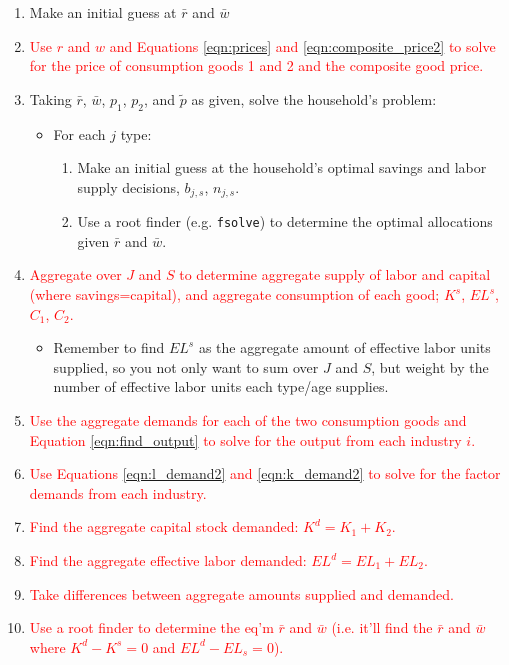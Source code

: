 \documentclass[letterpaper,12pt]{article}
\theoremstyle{definition}
\begin{document}
\begin{spacing}{1.5}
\begin{enumerate}
\item Make an initial guess at $\bar{r}$ and $\bar{w}$
\item \textcolor{red}{Use $r$ and $w$ and Equations \ref{eqn:prices} and \ref{eqn:composite_price2} to solve for the price of consumption goods 1 and 2 and the composite good price.}
\item Taking $\bar{r}$, $\bar{w}$, $p_{1}$, $p_{2}$, and $\tilde{p}$ as given, solve the household's problem:
	\begin{itemize}
	\item For each $j$ type:
		\begin{enumerate}
		\item Make an initial guess at the household's optimal savings and labor supply decisions, $b_{j,s}$, $n_{j,s}$.
		\item Use a root finder (e.g. \texttt{fsolve}) to determine the optimal allocations given $\bar{r}$ and $\bar{w}$.
		\end{enumerate}
	\end{itemize}
\item \textcolor{red}{Aggregate over $J$ and $S$ to determine aggregate supply of labor and capital (where savings=capital), and aggregate consumption of each good; $K^{s}$, ${EL}^{s}$, $C_{1}$, $C_{2}$.}
	\begin{itemize}
	\item Remember to find ${EL}^{s}$ as the aggregate amount of effective labor units supplied, so you not only want to sum over $J$ and $S$, but weight by the number of effective labor units each type/age supplies.
	\end{itemize}
\item \textcolor{red}{Use the aggregate demands for each of the two consumption goods and Equation \ref{eqn:find_output} to solve for the output from each industry $i$.}
\item \textcolor{red}{Use Equations \ref{eqn:l_demand2} and \ref{eqn:k_demand2} to solve for the factor demands from each industry.}
\item \textcolor{red}{Find the aggregate capital stock demanded: $K^{d} = K_{1}+K_{2}$.}
\item \textcolor{red}{Find the aggregate effective labor demanded: $EL^{d} = EL_{1}+EL_{2}$.}
\item \textcolor{red}{Take differences between aggregate amounts supplied and demanded.}
\item \textcolor{red}{Use a root finder to determine the eq'm $\bar{r}$ and $\bar{w}$ (i.e. it'll find the $\bar{r}$ and $\bar{w}$ where $K^{d}-K^{s}=0$ and ${EL}^{d}-{EL}_{s}=0$).}
\end{enumerate}


\end{spacing}
\end{document}

